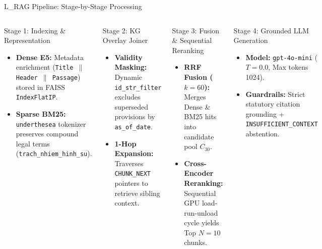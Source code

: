 \begin{frame}{L\_RAG Pipeline: Stage-by-Stage Processing}
\scriptsize
\begin{columns}[T]
    \begin{block}{Stage 1: Indexing \& Representation}
    \begin{itemize}
      \item \textbf{Dense E5:} Metadata enrichment (\texttt{Title $\parallel$ Header $\parallel$ Passage}) stored in FAISS \texttt{IndexFlatIP}.
      \item \textbf{Sparse BM25:} \texttt{underthesea} tokenizer preserves compound legal terms (\texttt{trach\_nhiem\_hinh\_su}).
    \end{itemize}
    \end{block}

    \begin{block}{Stage 2: KG Overlay Joiner}
    \begin{itemize}
      \item \textbf{Validity Masking:} Dynamic \texttt{id\_str\_filter} excludes superseded provisions by \texttt{as\_of\_date}.
      \item \textbf{1-Hop Expansion:} Traverses \texttt{CHUNK\_NEXT} pointers to retrieve sibling context.
    \end{itemize}
    \end{block}

    \begin{block}{Stage 3: Fusion \& Sequential Reranking}
    \begin{itemize}
      \item \textbf{RRF Fusion ($k=60$):} Merges Dense \& BM25 hits into candidate pool $C_{30}$.
      \item \textbf{Cross-Encoder Reranking:} Sequential GPU load-run-unload cycle yields Top $N=10$ chunks.
    \end{itemize}
    \end{block}

    \begin{block}{Stage 4: Grounded LLM Generation}
    \begin{itemize}
      \item \textbf{Model:} \texttt{gpt-4o-mini} ($T=0.0$, Max tokens 1024).
      \item \textbf{Guardrails:} Strict statutory citation grounding + \texttt{INSUFFICIENT\_CONTEXT} abstention.
    \end{itemize}
    \end{block}
\end{columns}
\end{frame}

